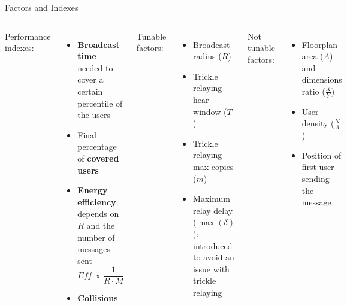 \documentclass[aspectratio=169]{beamer}
\begin{document}
\begin{frame}{Factors and Indexes}
	\begin{columns}
		Performance indexes:
		\begin{itemize}
			\item \textbf{Broadcast time} needed to cover a certain
				percentile of the users
			\item Final percentage of \textbf{covered users}
			\item \textbf{Energy efficiency}: depends on \(R\) and
				the number of messages sent
				\[\mathit{Eff} \propto \frac{1}{R \cdot M}\]
			\item \textbf{Collisions}
		\end{itemize}
		Tunable factors:
		\begin{itemize}
			\item Broadcast radius (\(R\))
			\item Trickle relaying hear window (\(T\))
			\item Trickle relaying max copies (\(m\))
			\item Maximum relay delay (\(\max(\delta)\)): introduced
				to avoid an issue with trickle relaying
		\end{itemize}
		Not tunable factors:
		\begin{itemize}
			\item Floorplan area (\(A\)) and dimensions ratio
				(\(\frac{X}{Y}\))
			\item User density (\(\frac{N}{A}\))
			\item Position of first user sending the message
		\end{itemize}
	\end{columns}
\end{frame}
\end{document}
